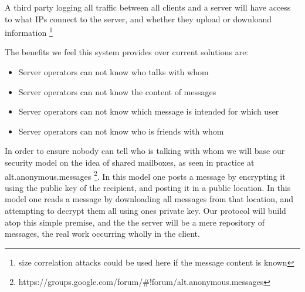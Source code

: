 A third party logging all traffic between all clients and a server will have
access to  what IPs connect to the
server, and whether they upload or downloand information \footnote{size
correlation attacks could be used here if the message content is known}

The benefits we feel this system provides over current solutions are:
\begin{itemize}
\item Server operators can not know who talks with whom
\item Server operators can not know the content of messages
\item Server operators can not know which message is intended for which user
\item Server operators can not know who is friends with whom
\end{itemize}

In order to ensure nobody can tell who is talking with whom we will base our
security model on the idea of shared mailboxes, as seen in practice at
alt.anonymous.messages
\footnote{https://groups.google.com/forum/\#!forum/alt.anonymous.messages}.
In this model one posts a message by encrypting it using the public key of the
recipient, and posting it in a public location. In this model one reads a
message by downloading all messages from that location, and attempting to
decrypt them all using ones private key. Our protocol will build atop this
simple premise, and the the server will be a mere repository of messages, the
real work occurring wholly in the client.
